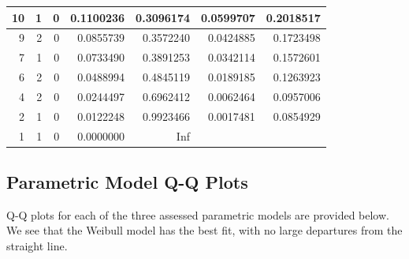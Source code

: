 \documentclass[
]{article}
\begin{document}
\begin{table}[!h]
\begin{tabular}[t]{r|r|r|r|r|r|r}
\hline
10 & 1 & 0 & 0.1100236 & 0.3096174 & 0.0599707 & 0.2018517\\
\hline
9 & 2 & 0 & 0.0855739 & 0.3572240 & 0.0424885 & 0.1723498\\
\hline
7 & 1 & 0 & 0.0733490 & 0.3891253 & 0.0342114 & 0.1572601\\
\hline
6 & 2 & 0 & 0.0488994 & 0.4845119 & 0.0189185 & 0.1263923\\
\hline
4 & 2 & 0 & 0.0244497 & 0.6962412 & 0.0062464 & 0.0957006\\
\hline
2 & 1 & 0 & 0.0122248 & 0.9923466 & 0.0017481 & 0.0854929\\
\hline
1 & 1 & 0 & 0.0000000 & Inf &  & \\
\hline
\end{tabular}
\end{table}

\newpage

\newpage

\hypertarget{parametric-model-q-q-plots}{%
\subsection{Parametric Model Q-Q
Plots}\label{parametric-model-q-q-plots}}

Q-Q plots for each of the three assessed parametric models are provided
below. We see that the Weibull model has the best fit, with no large
departures from the straight line.
\end{document}
